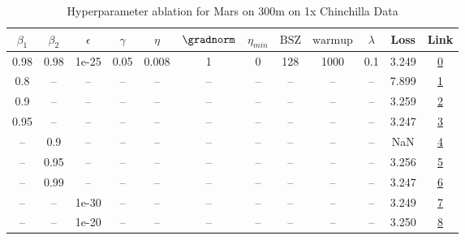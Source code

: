 \begin{table}[H]
\centering
\caption{Hyperparameter ablation for Mars on 300m on 1x Chinchilla Data}
\label{tab:ablation_mars_300m_on_1x_chinchilla_data}
\begin{tabular}{cccccccccccc}
\toprule
$\beta_1$ & $\beta_2$ & $\epsilon$ & $\gamma$ & $\eta$ & $\gradnorm$ & $\eta_{min}$ & $\mathrm{BSZ}$ & $\mathrm{warmup}$ & $\lambda$ & Loss & Link \\
\midrule
0.98 & 0.98 & 1e-25 & 0.05 & 0.008 & 1 & 0 & 128 & 1000 & 0.1 & 3.249 & \href{https://wandb.ai/stanford-mercury/optimizer-scaling/runs/sweep-300m-6B-mars9c7f7elr0.008-wd0.1-minlr0-warmup1000-b10.98-b-f63232}{0} \\
\midrule
0.8 & -- & -- & -- & -- & -- & -- & -- & -- & -- & 7.899 & \href{https://wandb.ai/stanford-mercury/optimizer-scaling/runs/sweep-300m-6B-mars51e60dlr0.008-wd0.1-minlr0-warmup1000-b10.8-b2-fcc8df}{1} \\
0.9 & -- & -- & -- & -- & -- & -- & -- & -- & -- & 3.259 & \href{https://wandb.ai/stanford-mercury/optimizer-scaling/runs/sweep-300m-6B-mars9bd75elr0.008-wd0.1-minlr0-warmup1000-b10.9-b2-cab9f0}{2} \\
0.95 & -- & -- & -- & -- & -- & -- & -- & -- & -- & 3.247 & \href{https://wandb.ai/stanford-mercury/optimizer-scaling/runs/sweep-300m-6B-mars328fcflr0.008-wd0.1-minlr0-warmup1000-b10.95-b-ce45f8}{3} \\
-- & 0.9 & -- & -- & -- & -- & -- & -- & -- & -- & NaN & \href{https://wandb.ai/stanford-mercury/optimizer-scaling/runs/sweep-300m-6B-marsb65964lr0.008-wd0.1-minlr0-warmup1000-b10.98-b-e8240b}{4} \\
-- & 0.95 & -- & -- & -- & -- & -- & -- & -- & -- & 3.256 & \href{https://wandb.ai/stanford-mercury/optimizer-scaling/runs/sweep-300m-6B-mars9f27e3lr0.008-wd0.1-minlr0-warmup1000-b10.98-b-a25628}{5} \\
-- & 0.99 & -- & -- & -- & -- & -- & -- & -- & -- & 3.247 & \href{https://wandb.ai/stanford-mercury/optimizer-scaling/runs/sweep-300m-6B-mars4f9747lr0.008-wd0.1-minlr0-warmup1000-b10.98-b-fd94ca}{6} \\
-- & -- & 1e-30 & -- & -- & -- & -- & -- & -- & -- & 3.249 & \href{https://wandb.ai/stanford-mercury/optimizer-scaling/runs/sweep-300m-6B-mars9c7f7elr0.008-wd0.1-minlr0-warmup1000-b10.98-b-f63232}{7} \\
-- & -- & 1e-20 & -- & -- & -- & -- & -- & -- & -- & 3.250 & \href{https://wandb.ai/stanford-mercury/optimizer-scaling/runs/sweep-300m-6B-mars25812alr0.008-wd0.1-minlr0-warmup1000-b10.98-b-0e08ff}{8} \\

\end{tabular}
\end{table}
